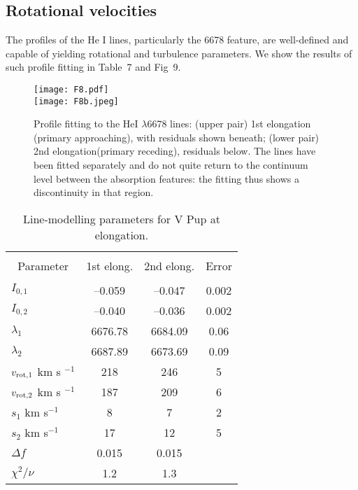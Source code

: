 \documentclass[useAMS,usenatbib]{mnras}                                                                           \usepackage[pdftex]{graphicx}
\begin{document}
\subsection{Rotational velocities}


 The profiles of the He I lines, particularly the 6678 feature,
are well-defined and capable of yielding rotational and turbulence parameters.
 We show the results of such profile fitting in Table~7 and Fig~9.
\begin{figure}
\label{fig-9}
\texttt{[image: F8.pdf]}\\
\texttt{[image: F8b.jpeg]}\\
\caption{Profile fitting to the HeI $\lambda$6678 lines: (upper pair)
1st elongation (primary approaching), with residuals shown beneath; 
(lower pair) 2nd elongation(primary receding), residuals below.
The lines have been fitted separately and do not quite return to the continuum level
between the absorption features: the fitting thus shows a discontinuity in that region.
}
\end{figure} 
 
 
 \begin{table}
\begin{center}
\caption{Line-modelling parameters for V Pup at elongation.  
\label{tbl-6}} 
\begin{tabular}{lccc}
   \hline  \\
\multicolumn{1}{c}{Parameter}  & \multicolumn{1}{c}{1st elong.} & \multicolumn{1}{c}{2nd elong.}
& \multicolumn{1}{c}{Error}\\
\hline \\
$I_{0, 1}$   & --0.059 &--0.047 &0.002\\
$I_{0, 2}$   & --0.040 &--0.036 &0.002\\
$\lambda_1$ & 6676.78 & 6684.09&0.06 \\
$\lambda_2$ & 6687.89 &6673.69 &0.09 \\
$v_{\rm rot, 1}$ km s $^{-1}$& 218 &246 &5 \\
$v_{\rm rot, 2}$ km s $^{-1}$& 187 &209 &6 \\
$s_1$ km s$^{-1}$& 8  & 7 &2 \\
$s_2$ km s$^{-1}$& 17  & 12 &5 \\
$\Delta f$   & 0.015 &0.015 &\\
$\chi^2/\nu$ & 1.2 & 1.3&\\
\hline
\end{tabular}
\end{center}
\end{table} 
 
\end{document}
